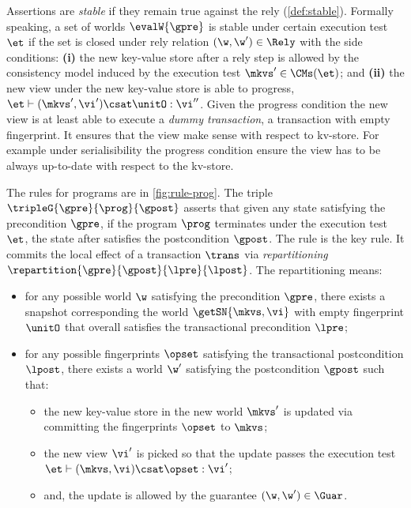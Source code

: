 Assertions are \emph{stable} if they remain true against the rely (\cref{def:stable}).
Formally speaking, a set of worlds \( \evalW{\gpre} \) is stable under certain execution test \( \et \) if the set is closed under rely relation \( (\w, \w') \in \Rely \) with the side conditions:
\textbf{(i)} the new key-value store after a rely step is allowed by the consistency model induced by the execution test \( \mkvs' \in \CMs(\et) \);
and \textbf{(ii)} the new view under the new key-value store is able to progress, \ie \( \et \vdash (\mkvs', \vi') \csat \unitO :  \vi'' \).
Given the progress condition the new view is at least able to execute a \emph{dummy transaction}, \ie a transaction with empty fingerprint.
It ensures that the view make sense with respect to kv-store.
For example under serialisibility the progress condition ensure the view has to be always up-to-date with respect to the kv-store.

The rules for programs are in \cref{fig:rule-prog}.
The triple \( \tripleG{\gpre}{\prog}{\gpost} \) asserts that given any state satisfying the precondition \( \gpre \), if the program \( \prog \) terminates under the execution test \( \et \), the state after satisfies the postcondition \( \gpost \).
The  rule is the key rule.
It commits the local effect of a transaction \( \trans \) via \emph{repartitioning} \( \repartition{\gpre}{\gpost}{\lpre}{\lpost} \).
The repartitioning means:
\begin{itemize}
\item
for any possible world \( \w \) satisfying the precondition \( \gpre \), there exists a snapshot corresponding the world \( \getSN{\mkvs, \vi} \) with empty fingerprint \( \unitO \) that overall satisfies the transactional precondition \( \lpre \);
\item
for any possible fingerprints  \( \opset \) satisfying the transactional postcondition \( \lpost \), there exists a world \( \w' \) satisfying the postcondition \( \gpost \) such that:
\begin{itemize}
\item 
the new key-value store in the new world \( \mkvs' \) is updated via committing the fingerprints \( \opset \) to \( \mkvs \);
\item
the new view \( \vi' \) is picked so that the update passes the execution test \( \et \vdash (\mkvs,\vi) \csat \opset : \vi' \);
\item
and, the update is allowed by the guarantee \( (\w, \w') \in \Guar\).
\end{itemize}
\end{itemize}


